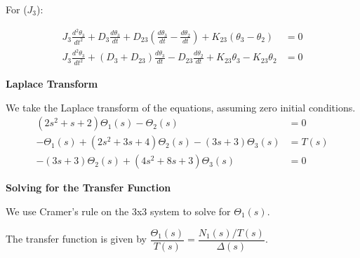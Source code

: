 \documentclass[11pt]{article}
\begin{document}
{For ($J_3$):}

\begin{figure}[h!]
  \centering
\end{figure}


\begin{align*}
J_3\frac{d^2\theta_3}{dt^2}
+ D_3\frac{d\theta_3}{dt}
+ D_{23}\!\left(\frac{d\theta_3}{dt}-\frac{d\theta_2}{dt}\right)
+ K_{23}\!\left(\theta_3-\theta_2\right) &= 0 \\[4pt]
J_3\frac{d^2\theta_3}{dt^2}
+ (D_3+D_{23})\frac{d\theta_3}{dt}
- D_{23}\frac{d\theta_2}{dt}
+ K_{23}\theta_3
- K_{23}\theta_2 &= 0
\end{align*}


\noindent\textbf{Laplace Transform}
\vspace{8pt}

We take the Laplace transform of the equations, assuming zero initial conditions.
\begin{align}
    (2s^2 + s + 2)\Theta_1(s) - \Theta_2(s) &= 0 \tag{1}\\
    -\Theta_1(s) + (2s^2 + 3s + 4)\Theta_2(s) - (3s+3)\Theta_3(s) &= T(s)\tag{2} \\
    -(3s+3)\Theta_2(s) + (4s^2 + 8s + 3)\Theta_3(s) &= 0 \tag{3}
\end{align}


\noindent\textbf{Solving for the Transfer Function}
\vspace{8pt}

\noindent We use Cramer's rule on the 3x3 system to solve for $\Theta_1(s)$. 

\vspace{8pt}

The transfer function is given by $\dfrac{\Theta_1(s)}{T(s)} = \dfrac{N_1(s)/T(s)}{\Delta(s)}$.
\end{document}
